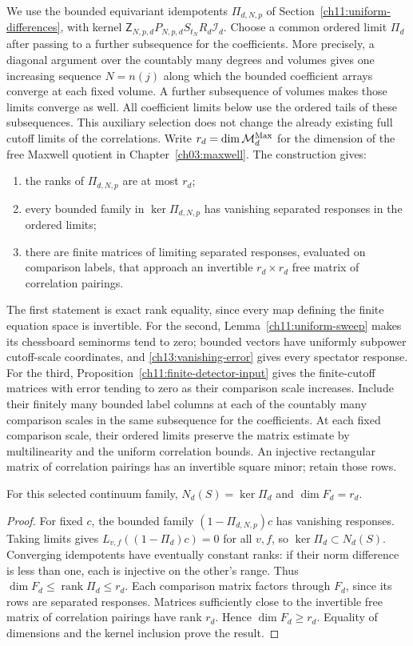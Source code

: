 We use the bounded equivariant idempotents $\Pi_{d,N,p}$ of
Section~\ref{ch11:uniform-differences}, with kernel
$\mathsf Z_{N,p,d}P_{N,p,d}S_{t_N}R_d\mathcal I_d$.
Choose a common ordered limit $\Pi_d$ after passing to a further subsequence for the coefficients. More
precisely, a diagonal argument over the countably many degrees and
volumes gives one increasing sequence $N=n(j)$ along which the bounded
coefficient arrays converge at each fixed volume. A further subsequence of volumes
makes those limits converge as well. All coefficient
limits below use the ordered tails of these subsequences. This auxiliary selection
does not change the already existing full cutoff limits of the
correlations. Write
$r_d=\dim\mathcal M_d^{\rm Max}$ for the dimension of the free Maxwell
quotient in Chapter~\ref{ch03:maxwell}. The construction gives:
\begin{enumerate}
\item the ranks of $\Pi_{d,N,p}$ are at most $r_d$;
\item every bounded family in $\ker\Pi_{d,N,p}$ has vanishing
separated responses in the ordered limits;
\item there are finite matrices of limiting separated responses,
evaluated on comparison labels, that approach an invertible
$r_d\times r_d$ free matrix of correlation pairings.
\end{enumerate}
The first statement is exact rank equality, since every map defining
the finite equation space is invertible. For the second,
Lemma~\ref{ch11:uniform-sweep} makes its chessboard seminorms tend
to zero; bounded vectors have uniformly subpower cutoff-scale
coordinates, and \eqref{ch13:vanishing-error} gives every spectator
response. For the third, Proposition~\ref{ch11:finite-detector-input}
gives the finite-cutoff matrices with error tending to zero
as their comparison scale increases. Include their finitely many
bounded label columns at each of the countably many comparison scales
in the same subsequence for the coefficients. At each fixed comparison scale, their
ordered limits preserve the matrix estimate by multilinearity and
the uniform correlation bounds. An injective rectangular matrix of correlation pairings
has an invertible square minor; retain those rows.

\begin{proposition}
\label{ch13:rank}
For this selected continuum family,
$N_d(S)=\ker\Pi_d$ and $\dim F_d=r_d$.
\end{proposition}
\begin{proof}
For fixed $c$, the bounded family $(1-\Pi_{d,N,p})c$ has vanishing
responses. Taking limits gives $L_{v,f}((1-\Pi_d)c)=0$ for all
$v,f$, so $\ker\Pi_d\subset N_d(S)$. Converging idempotents have
eventually constant ranks: if their norm difference is less than
one, each is injective on the other's range. Thus
$\dim F_d\le\operatorname{rank}\Pi_d\le r_d$.
Each comparison matrix factors through $F_d$, since its rows are
separated responses. Matrices sufficiently close to the invertible
free matrix of correlation pairings have rank $r_d$. Hence $\dim F_d\ge r_d$.
Equality of dimensions and the kernel inclusion prove the result.
\end{proof}

